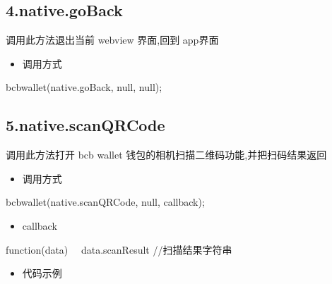 \documentclass[letterpaper,10pt,english]{sphinxmanual}
\begin{document}
\subsection{4.native.goBack}
\label{\detokenize{jsapi:native-goback}}
调用此方法退出当前 webview 界面,回到 app界面
\begin{itemize}
\item {} 
调用方式

\end{itemize}

\begin{sphinxVerbatim}[commandchars=\\\{\}]
bcbwallet(\PYGZsq{}native.goBack\PYGZsq{}, null, null);
\end{sphinxVerbatim}


\subsection{5.native.scanQRCode}
\label{\detokenize{jsapi:native-scanqrcode}}
调用此方法打开 bcb wallet 钱包的相机扫描二维码功能,并把扫码结果返回
\begin{itemize}
\item {} 
调用方式

\end{itemize}

\begin{sphinxVerbatim}[commandchars=\\\{\}]
bcbwallet(\PYGZsq{}native.scanQRCode\PYGZsq{}, null, callback);
\end{sphinxVerbatim}
\begin{itemize}
\item {} 
callback

\end{itemize}

\begin{sphinxVerbatim}[commandchars=\\\{\}]
function(data) \PYGZob{}
　data.scanResult //扫描结果字符串
\PYGZcb{}
\end{sphinxVerbatim}
\begin{itemize}
\item {} 
代码示例

\end{itemize}

\begin{sphinxVerbatim}[commandchars=\\\{\}]
    
\end{sphinxVerbatim}
\end{document}
